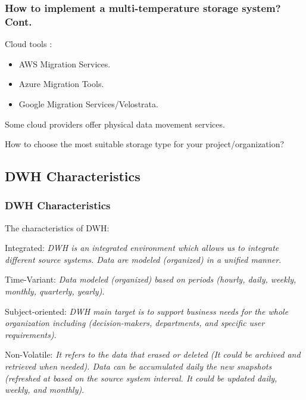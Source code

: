 
\begin{frame}
\frametitle{How to implement a multi-temperature storage system? Cont.}
\begin{wideitemize}
\item Cloud tools \forexample:
\begin{itemize}
\item AWS Migration Services.
\item Azure Migration Tools.
\item Google Migration Services/Velostrata.
\end{itemize}
\item Some cloud providers offer physical data movement services.
\item How to choose the most suitable storage type for your project/organization?
\end{wideitemize}
\end{frame}
\VideoClassification[column=2, colour=red]
\subsection{DWH Characteristics}
\begin{frame}
    \frametitle{DWH Characteristics}
    \begin{wideitemize}
        \item The characteristics of DWH:
        \begin{wideitemize}
        	\item Integrated: \textit{DWH is an integrated environment which allows us to
        	integrate different source systems. Data are modeled (organized) in a unified manner}.%
        	
        	\item Time-Variant: \textit{Data modeled (organized) based on periods
        	(hourly, daily, weekly, monthly, quarterly, yearly)}.
        	
        	\item Subject-oriented: \textit{DWH main target is to support business needs for
        	the whole organization including (decision-makers, departments, and
        	specific user requirements)}.
        	
        	\item Non-Volatile: \textit{It refers to the data that erased or deleted (It could be archived and retrieved when needed). Data can be accumulated daily the new snapshots (refreshed at based on the source system interval.  \faArrowCircleORight \space It could be updated daily, weekly, and monthly)}.
        \end{wideitemize}
    \end{wideitemize}
\end{frame}
